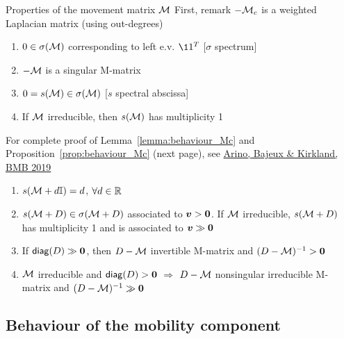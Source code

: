\documentclass[aspectratio=169]{beamer}\usepackage[]{graphicx}\usepackage[]{xcolor}
\begin{document}
\begin{frame}{Properties of the movement matrix $\mathcal{M}$}
	First, remark $-\mathcal{M}_c$ is a weighted Laplacian matrix (using out-degrees)
	\vfill
	\begin{lemma}\label{lemma:behaviour_Mc}
		\begin{enumerate}
			\item $0\in\sigma(\mathcal{M})$ corresponding to left e.v. $\11^T$ \hfill[$\sigma$ spectrum]
			\item $-\mathcal{M}$ is a singular M-matrix
			\item $0=s(\mathcal{M})\in\sigma(\mathcal{M})$ \hfill[$s$ spectral abscissa]
			\item If $\mathcal{M}$ irreducible, then $s(\mathcal{M})$ has multiplicity 1
		\end{enumerate}
	\end{lemma}
	\vfill
	For complete proof of Lemma~\ref{lemma:behaviour_Mc} and Proposition~\ref{prop:behaviour_Mc} (next page), see \href{http://dx.doi.org/10.1007/s11538-019-00593-1}{Arino, Bajeux \& Kirkland, BMB 2019}
\end{frame}

\begin{frame}
	\begin{proposition}
		\label{prop:behaviour_Mc}
		\begin{enumerate}
			\item $s(\mathcal{M}+d\mathbb{I})=d$, $\forall d\in\mathbb{R}$
			\item $s(\mathcal{M}+D)\in\sigma(\mathcal{M}+D)$ associated to $\bv>\b0$. If $\mathcal{M}$ irreducible, $s(\mathcal{M}+D)$ has  multiplicity 1 and is associated to $\bv\gg \b0$
			\item If $\diag (D)\gg \b0$, then $D-\mathcal{M}$ invertible M-matrix and $(D-\M)^{-1}> \b0$
			\item $\mathcal{M}$ irreducible and $\diag(D)>\b0$ $\Longrightarrow$ $D-\mathcal{M}$ nonsingular irreducible M-matrix and $(D-\M)^{-1}\gg \b0$		
		\end{enumerate}
	\end{proposition}
\end{frame}


\subsection{Behaviour of the mobility component}


\end{document}
